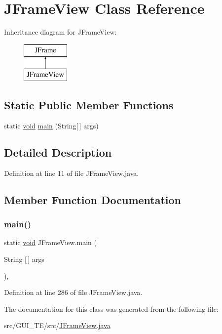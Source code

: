 \hypertarget{class_j_frame_view}{}\section{J\+Frame\+View Class Reference}
\label{class_j_frame_view}
Inheritance diagram for J\+Frame\+View\+:\begin{figure}[H]
\begin{center}
\leavevmode
\includegraphics[height=2.000000cm]{class_j_frame_view}
\end{center}
\end{figure}
\subsection*{Static Public Member Functions}
\begin{DoxyCompactItemize}
\item 
static \mbox{\hyperlink{_s_d_l__opengles2__gl2ext_8h_ae5d8fa23ad07c48bb609509eae494c95}{void}} \mbox{\hyperlink{class_j_frame_view_a4c95788a713348d52eeff67e3e8c4e17}{main}} (String\mbox{[}$\,$\mbox{]} args)
\end{DoxyCompactItemize}


\subsection{Detailed Description}


Definition at line 11 of file J\+Frame\+View.\+java.



\subsection{Member Function Documentation}
\mbox{\label{class_j_frame_view_a4c95788a713348d52eeff67e3e8c4e17}} 
\subsubsection{\texorpdfstring{main()}{main()}}
{\footnotesize\ttfamily static \mbox{\hyperlink{_s_d_l__opengles2__gl2ext_8h_ae5d8fa23ad07c48bb609509eae494c95}{void}} J\+Frame\+View.\+main (\begin{DoxyParamCaption}\item[{String \mbox{[}$\,$\mbox{]}}]{args }\end{DoxyParamCaption})\hspace{0.3cm}{\ttfamily [inline]}, {\ttfamily [static]}}



Definition at line 286 of file J\+Frame\+View.\+java.



The documentation for this class was generated from the following file\+:\begin{DoxyCompactItemize}
\item 
src/\+G\+U\+I\+\_\+\+T\+E/src/\mbox{\hyperlink{_j_frame_view_8java}{J\+Frame\+View.\+java}}\end{DoxyCompactItemize}
